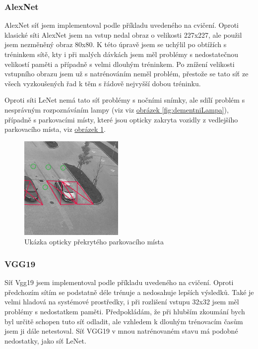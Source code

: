 \documentclass[10pt,a4paper, table]{article}
\begin{document}
\subsubsection{AlexNet}
AlexNet síť jsem implementoval podle příkladu uvedeného na cvičení. Oproti klasické síti AlexNet jsem na vstup nedal obraz o velikosti 227x227, ale použil jsem nezměněný obraz 80x80. K této úpravě jsem se uchýlil po obtížích s tréninkem sítě, kty i při malých dávkách jsem měl problémy s nedostatečnou velikostí paměti a případně s velmi dlouhým tréninkem. Po znížení velikosti vstupního obrazu jsem už s natrénováním neměl problém, přestože se tato síť ze všech vyzkoušených řad k těm s řádově nejvyšší dobou tréninku. \par
Oproti síti LeNet nemá tato síť problémy s nočními snímky, ale sdílí problém s nesprávným rozpoznáváním lampy (viz viz \hyperref[fig:dementniLampa]{obrázek \ref{fig:dementniLampa}}), případně s parkovacími místy, které jsou opticky zakryta vozidly z vedlejšího parkovacího místa, viz \hyperref[fig:optickePrekryti]{obrázek \ref{fig:optickePrekryti}}.

\begin{figure}[h]
  \centering
  \includegraphics[width=5cm]{images/optickePrekryti.png}
  \caption{Ukázka opticky překrytého parkovacího místa }%
  \label{fig:optickePrekryti}%
\end{figure}
\subsubsection{VGG19}
Síť Vgg19 jsem implementoval podle příkladu uvedeného na cvičení. Oproti předchozím sítím se podstatně déle trénuje a nedosahuje lepších výsledků. Také je velmi hladová na systémové prostředky, i při rozlišení vstupu 32x32 jsem měl problémy s nedostatkem paměti. Předpokládám, že při hlubším zkoumání bych byl určitě schopen tuto síť odladit, ale vzhledem k dlouhým trénovacím časům jsem ji dále netestoval. Síť VGG19 v mnou natrénovaném stavu má podobné nedostatky, jako síť LeNet.
\end{document}
